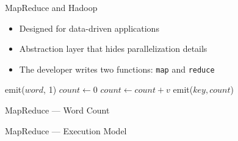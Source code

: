 \documentclass[compress]{beamer}
\begin{document}
\begin{frame}[fragile]{MapReduce and Hadoop}
  \begin{center}
    \begin{itemize}
    \item Designed for data-driven applications
    \item Abstraction layer that hides parallelization details
    \item The developer writes two functions: \texttt{map} and \texttt{reduce}
    \end{itemize}
    \begin{algorithm}[H]
      \label{alg:wc}
      \begin{algorithmic}
        \State{} emit($word$, 1)
        \EndFor{}
        \EndFunction{}
        \State{} $count\gets 0$
        \State{} $count\gets count+v$
        \EndFor{}
        \State{} emit($key,count$)
        \EndFunction{}
      \end{algorithmic}
    \end{algorithm}
  \end{center}
\end{frame}

\begin{frame}{MapReduce --- Word Count}
  \begin{center}
 \end{center}
\end{frame}

\begin{frame}{MapReduce --- Execution Model}
  \begin{center}
 \end{center}
\end{frame}
\end{document}
